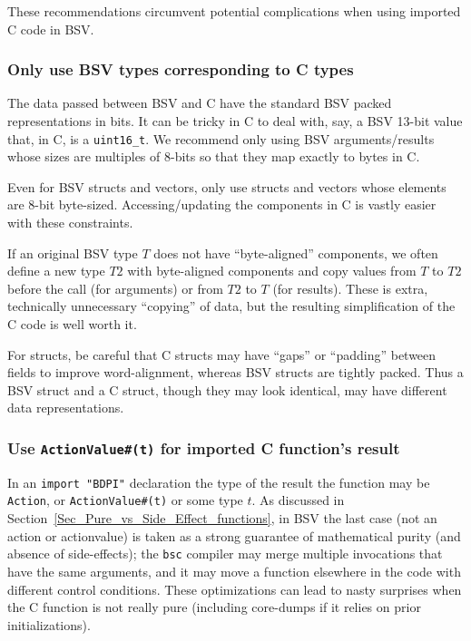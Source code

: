 These recommendations circumvent potential complications when using
imported C code in BSV.


\subsubsection{Only use BSV types corresponding to C types}

The data passed between BSV and C have the standard BSV packed
representations in bits.  It can be tricky in C to deal with, say, a
BSV 13-bit value that, in C, is a \verb|uint16_t|.  We recommend only
using BSV arguments/results whose sizes are multiples of 8-bits so
that they map exactly to bytes in C.

Even for BSV structs and vectors, only use structs and vectors whose
elements are 8-bit byte-sized.  Accessing/updating the components in C
is vastly easier with these constraints.

If an original BSV type $T$ does not have ``byte-aligned'' components,
we often define a new type $T2$ with byte-aligned components and copy
values from $T$ to $T2$ before the call (for arguments) or from $T2$
to $T$ (for results).  These is extra, technically unnecessary
``copying'' of data, but the resulting simplification of the C code is
well worth it.

For structs, be careful that C structs may have ``gaps'' or
``padding'' between fields to improve word-alignment, whereas BSV
structs are tightly packed.  Thus a BSV struct and a C struct, though
they may look identical, may have different data representations.


\subsubsection{Use {\tt ActionValue\#(t)} for imported C function's result}

In an \verb|import "BDPI"| declaration the type of the result the
function may be \verb|Action|, or \verb|ActionValue#(t)| or some type
$t$.  As discussed in Section~\ref{Sec_Pure_vs_Side_Effect_functions},
in BSV the last case (not an action or actionvalue) is taken as a
strong guarantee of mathematical purity (and absence of side-effects);
the \verb|bsc| compiler may merge multiple invocations that have the
same arguments, and it may move a function elsewhere in the code with
different control conditions.  These optimizations can lead to nasty
surprises when the C function is not really pure (including core-dumps
if it relies on prior initializations).

